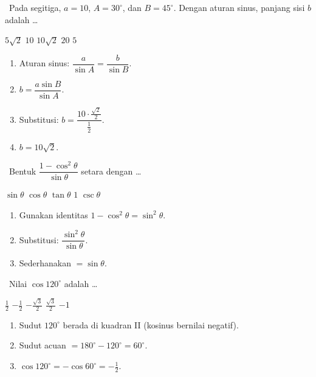 \documentclass[11pt,a4paper]{exam}
\newenvironment{langkah}{%
  \begin{enumerate}[label=\textbf{Langkah \arabic*:},leftmargin=2.6em,
    itemsep=2pt,topsep=2pt]}{\end{enumerate}}
\newcommand{\Adv}{{\footnotesize\textsf{\textcolor{oranye}{[Advanced]}}}\ }
\begin{document}
\begin{questions}
\question \Adv Pada segitiga, $a=10$, $A=30^\circ$, dan $B=45^\circ$. Dengan aturan
sinus, panjang sisi $b$ adalah \dots
\begin{choices}
\choice $5\sqrt{2}$ \choice $10$ \CorrectChoice $10\sqrt{2}$ \choice $20$ \choice $5$
\end{choices}
\begin{solution}
\begin{langkah}
\item Aturan sinus: $\dfrac{a}{\sin A} = \dfrac{b}{\sin B}$.
\item $b = \dfrac{a\sin B}{\sin A}$.
\item Substitusi: $b = \dfrac{10\cdot \frac{\sqrt2}{2}}{\frac12}$.
\item $b = 10\sqrt2$.
\end{langkah}
\end{solution}

\question \Adv Bentuk $\dfrac{1-\cos^{2}\theta}{\sin\theta}$ setara dengan \dots
\begin{choices}
\CorrectChoice $\sin\theta$ \choice $\cos\theta$ \choice $\tan\theta$ \choice $1$ \choice $\csc\theta$
\end{choices}
\begin{solution}
\begin{langkah}
\item Gunakan identitas $1-\cos^{2}\theta = \sin^{2}\theta$.
\item Substitusi: $\dfrac{\sin^{2}\theta}{\sin\theta}$.
\item Sederhanakan $= \sin\theta$.
\end{langkah}
\end{solution}

\question \Adv Nilai $\cos 120^\circ$ adalah \dots
\begin{choices}
\choice $\tfrac{1}{2}$ \CorrectChoice $-\tfrac{1}{2}$ \choice $-\tfrac{\sqrt{3}}{2}$
\choice $\tfrac{\sqrt{3}}{2}$ \choice $-1$
\end{choices}
\begin{solution}
\begin{langkah}
\item Sudut $120^\circ$ berada di kuadran II (kosinus bernilai negatif).
\item Sudut acuan $= 180^\circ - 120^\circ = 60^\circ$.
\item $\cos 120^\circ = -\cos 60^\circ = -\tfrac12$.
\end{langkah}
\end{solution}


\end{questions}
\end{document}
